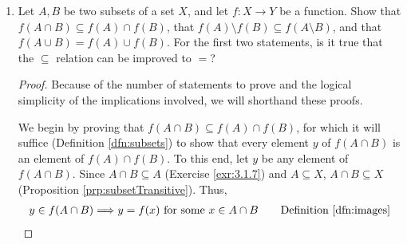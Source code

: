 \documentclass[../main.tex]{subfiles}
\begin{document}
\begin{enumerate}[ref={\thesection.\arabic*}]
\begin{proof}
        By Definition \ref{dfn:subsets}, to prove that $S\subseteq f^{-1}(f(S))$, we must verify that every element $x\in S$ is an element of $f^{-1}(f(S))$. Suppose $x$ is any element of $S$. To prove that $x\in\{x'\in X:f(x')\in\{f(x''):x''\in S\}\}$, Axiom \ref{axm:specification} tells us that it will suffice to show that $x\in X$ and "$f(x)\in\{f(x'):x'\in S\}$" is a true statement. Since $S\subseteq X$ and $x\in S$, we have by Definition \ref{dfn:subsets} that $x\in X$. On the other hand, let $y=f(x)$. Then since $x\in S$, by Axiom \ref{axm:replacement}, $y\in\{y':y'=f(x')\text{ for some }x'\in S\} \Longrightarrow f(x)\in\{f(x'):x'\in S\}$.\par
        By Definition \ref{dfn:subsets}, to prove that $f(f^{-1}(U))\subseteq U$, we must verify that every element $y\in f(f^{-1}(U))$ is an element of $U$. Suppose $y$ is any element of $f(f^{-1}(U))$. Then by the rigid definition of $f(f^{-1}(U))$, above, and Definition \ref{dfn:setEquality}, we have $y\in\{f(x):x\in\{x'\in X:f(x')\in U\}\}$. By Axiom \ref{axm:replacement}, this means that $y=f(x)$ for some $x\in\{x'\in X:f(x')\in U\}$. But by Axiom \ref{axm:specification}, $x\in\{x'\in X:f(x')\in U\} \Longrightarrow (x\in X\text{ and }f(x)\in U)$. Thus, we know that $y=f(x)$ for some $f(x)\in U$, so we have $y\in U$.
    \end{proof}
    \item \label{exr:3.4.3}Let $A,B$ be two subsets of a set $X$, and let $f:X\to Y$ be a function. Show that $f(A\cap B)\subseteq f(A)\cap f(B)$, that $f(A)\setminus f(B)\subseteq f(A\setminus B)$, and that $f(A\cup B)=f(A)\cup f(B)$. For the first two statements, is it true that the $\subseteq$ relation can be improved to $=$?
    \begin{proof}
        Because of the number of statements to prove and the logical simplicity of the implications involved, we will shorthand these proofs.\par
        We begin by proving that $f(A\cap B)\subseteq f(A)\cap f(B)$, for which it will suffice (Definition \ref{dfn:subsets}) to show that every element $y$ of $f(A\cap B)$ is an element of $f(A)\cap f(B)$. To this end, let $y$ be any element of $f(A\cap B)$. Since $A\cap B\subseteq A$ (Exercise \ref{exr:3.1.7}) and $A\subseteq X$, $A\cap B\subseteq X$ (Proposition \ref{prp:subsetTransitive}). Thus,
        \begin{align*}
            y\in f(A\cap B) &\Longrightarrow y=f(x)\text{ for some }x\in A\cap B \tag*{Definition \ref{dfn:images}}\\

\end{align*}
\end{proof}
\end{enumerate}
\end{document}
